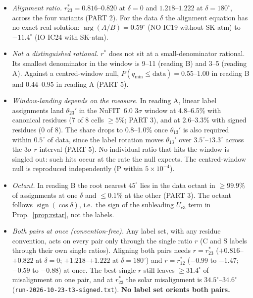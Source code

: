 \begin{itemize}
\item \emph{Alignment ratio.} $r^*_{23}=0.816$--$0.820$ at $\delta=0$ and $1.218$--$1.222$ at
  $\delta=180^\circ$, across the four variants (PART 2). For the data $\delta$ the alignment
  equation has no exact real solution: $\arg(A/B)=0.59^\circ$ (NO IC19 without SK-atm) to
  $-11.4^\circ$ (IO IC24 with SK-atm).
\item \emph{Not a distinguished rational.} $r^*$ does not sit at a small-denominator rational.
  Its smallest denominator in the window is 9--11 (reading B) and 3--5 (reading A). Against a
  centred-window null, $P(q_{\min}\le\text{data})=0.55$--$1.00$ in reading B and $0.44$--$0.95$ in
  reading A (PART 5).
\item \emph{Window-landing depends on the measure.} In reading A, linear label assignments land
  $\theta_{23}'$ in the NuFIT~6.0 $3\sigma$ window at 4.8--6.5\% with canonical residues (7 of 8 cells
  $\ge5\%$; PART 3), and at 2.6--3.3\% with signed residues (0 of 8). The share drops to 0.8--1.0\%
  once $\theta_{13}'$ is also required within $0.5^\circ$ of data, since the label rotation moves
  $\theta_{13}'$ over $3.5^\circ$--$13.3^\circ$ across the $3\sigma$ $r$-interval (PART 5). No
  individual ratio that hits the window is singled out: such hits occur at the rate the null
  expects. The centred-window null is reproduced independently (P within $5\times10^{-4}$).
\item \emph{Octant.} In reading B the root nearest $45^\circ$ lies in the data octant in
  $\ge99.9\%$ of assignments at one $\delta$ and $\le0.1\%$ at the other (PART 3). The octant follows
  $\operatorname{sign}(\cos\delta)$, i.e.\ the sign of the subleading $U_{e3}$ term in
  Prop.~\ref{prop:rstar}, not the labels.
\item \emph{Both pairs at once (convention-free).} Any label set, with any residue convention,
  acts on every pair only through the single ratio $r$ (C and S labels through their own single
  ratios). Aligning both pairs needs $r=r^*_{23}$ ($+0.816$--$+0.822$ at $\delta=0$;
  $+1.218$--$+1.222$ at $\delta=180^\circ$) and $r=r^*_{12}$ ($-0.99$ to $-1.47$; $-0.59$ to $-0.88$)
  at once. The best single $r$ still leaves $\ge31.4^\circ$ of misalignment on one pair, and at
  $r^*_{23}$ the solar misalignment is $34.5^\circ$--$34.6^\circ$
  (\texttt{run-2026-10-23-t3-signed.txt}). \textbf{No label set orients both pairs.}
\end{itemize}

